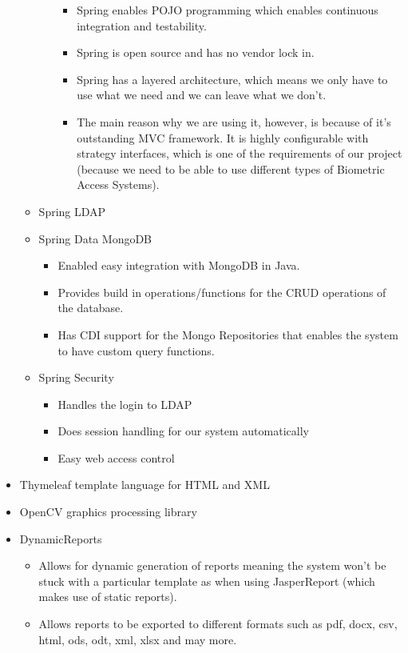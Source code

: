 \begin{itemize}
\begin{itemize}
\begin{itemize}
\begin{itemize}
						\item Spring enables POJO programming which enables continuous integration and testability.
						\item Spring is open source and has no vendor lock in.
						\item Spring has a layered architecture, which means we only have to use what we need and we can leave what we don't.
						\item The main reason why we are using it, however, is because of it's outstanding MVC framework. It is highly configurable with strategy interfaces, which is one of the requirements of our project (because we need to be able to use different types of Biometric Access Systems).
					\end{itemize}
					
				\end{itemize}
			\item Spring LDAP
			\item Spring Data MongoDB
				\begin{itemize}
					\item Enabled easy integration with MongoDB in Java.
					\item Provides build in operations/functions for the CRUD operations of the database.
					\item Has CDI support for the Mongo Repositories that enables the system to have custom query functions.
				\end{itemize}
			\item Spring Security
				\begin{itemize}
					\item Handles the login to LDAP
					\item Does session handling for our system automatically
					\item Easy web access control
				\end{itemize}
		\end{itemize}
	\item Thymeleaf template language for HTML and XML
	\item OpenCV graphics processing library
	\item DynamicReports
		\begin{itemize}
			\item Allows for dynamic generation of reports meaning the system won't be stuck with a particular template as when using JasperReport (which makes use of static reports).
			\item Allows reports to be exported to different formats such as pdf, docx, csv, html, ods, odt, xml, xlsx and may more.

\end{itemize}
\end{itemize}
